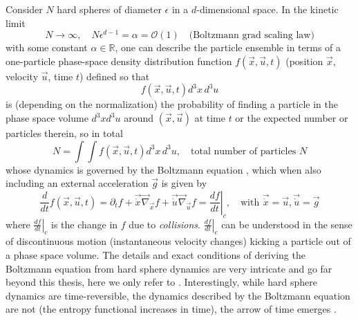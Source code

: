 Consider $N$ hard spheres of
diameter $\epsilon$ in a $d$-dimensional space. In the kinetic limit 
\begin{equation}
    N \rightarrow \infty, \quad N\epsilon^{d-1} = \alpha = \mathcal{O}(1) \quad \text{(Boltzmann grad scaling law)}
    \label{eq:boltzmann_grad}
\end{equation}
with some constant $\alpha \in \mathbb{R}$, one can describe the particle ensemble
in terms of a one-particle phase-space density distribution function $f(\vec{x}, \vec{u},t)$ (position $\vec{x}$, velocity $\vec{u}$, time $t$)
defined so that
\begin{equation}
    f(\vec{x},\vec{u},t) d^3x \, d^3u
\end{equation}
is (depending on the normalization) the probability of finding a particle in the
phase space volume $d^3xd^3u$ around $(\vec{x},\vec{u})$ at time $t$ or the expected
number or particles therein, so in total
\begin{equation}
    N = \int \int f(\vec{x},\vec{u},t) d^3x \, d^3u, \quad \text{total number of particles } N
\end{equation}
whose dynamics is governed by the Boltzmann equation \citep{bodin}, which when also including
an external acceleration $\vec{g}$ is given by
\begin{equation}
    \frac{d}{dt} f(\vec{x},\vec{u},t) = \partial_t f + \vec{\dot{x}} \vec{\nabla}_\vec{x} f + \vec{\dot{u}} \vec{\nabla}_\vec{u} f = \left. \frac{df}{dt} \right|_c, \quad \text{with } \vec{\dot{x}} = \vec{u}, \vec{\dot{u}} = \vec{g}
\end{equation}  
\citep{bodin} where $\left. \frac{df}{dt} \right|_c$ is the change in $f$ due to \textit{collisions}.
$\left. \frac{df}{dt} \right|_c$ can be understood in the sense of discontinuous motion (instantaneous velocity changes)
kicking a particle out of a phase space volume. The details and exact conditions of deriving
the Boltzmann equation from hard sphere dynamics are very intricate and go far beyond this thesis,
here we only refer to \cite{deng24}. Interestingly, while hard sphere dynamics are time-reversible,
the dynamics described by the Boltzmann equation are not (the entropy functional 
increases in time), the arrow of time emerges \citep{ardourel17,deng24,villani2008}.

